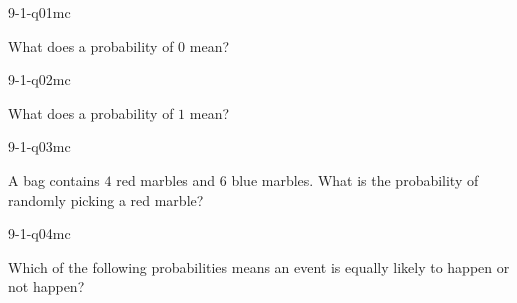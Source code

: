

\begin{practiceQuestion}{9-1-q01}{mc}
\begin{questionText}
What does a probability of $0$ mean?
\end{questionText}
\end{practiceQuestion}

\begin{practiceQuestion}{9-1-q02}{mc}
\begin{questionText}
What does a probability of $1$ mean?
\end{questionText}
\end{practiceQuestion}

\begin{practiceQuestion}{9-1-q03}{mc}
\begin{questionText}
A bag contains $4$ red marbles and $6$ blue marbles. What is the probability of randomly picking a red marble?
\end{questionText}
\end{practiceQuestion}

\begin{practiceQuestion}{9-1-q04}{mc}
\begin{questionText}
Which of the following probabilities means an event is equally likely to happen or not happen?
\end{questionText}
\end{practiceQuestion}

